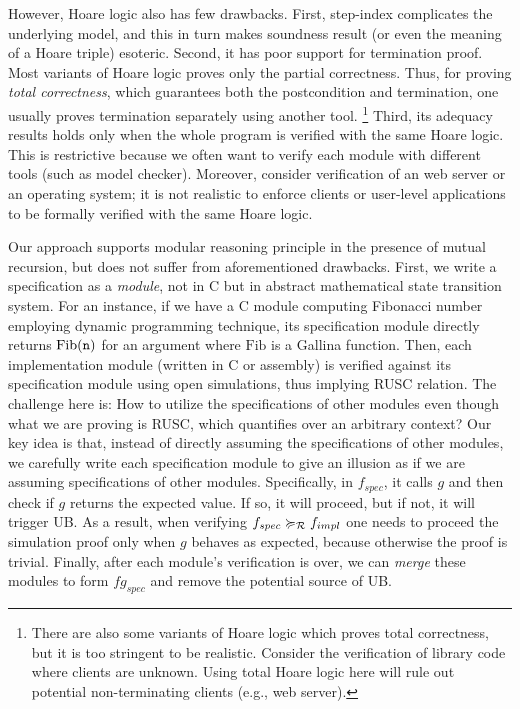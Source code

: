 However, Hoare logic also has few drawbacks.
First, step-index complicates the underlying model, and this in turn makes soundness result (or even the meaning of a Hoare triple) esoteric.
Second, it has poor support for termination proof.
Most variants of Hoare logic proves only the partial correctness.
Thus, for proving {\it total correctness}, which guarantees both the postcondition and termination, one usually proves termination separately using another tool.
\footnote{There are also some variants of Hoare logic which proves total correctness, but it is too stringent to be realistic. Consider the verification of library code where clients are unknown.
Using total Hoare logic here will rule out potential non-terminating clients (e.g., web server).}
Third, its adequacy results holds only when the whole program is verified with the same Hoare logic. This is restrictive because we often want to verify each module with different tools (such as model checker).
Moreover, consider verification of an web server or an operating system; it is not realistic to enforce clients or user-level applications to be formally verified with the same Hoare logic.



Our approach supports modular reasoning principle in the presence of mutual recursion, but does not suffer from aforementioned drawbacks.
First, we write a specification as a {\it module}, not in C but in abstract mathematical state transition system. %
For an instance, if we have a C module computing Fibonacci number employing dynamic programming technique, its specification module directly returns $\mathrm{Fib}(\texttt{n})$ for an argument  where $\mathrm{Fib}$ is a Gallina function.
Then, each implementation module (written in C or assembly) is verified against its specification module using open simulations, thus implying RUSC relation.
The challenge here is: How to utilize the specifications of other modules even though what we are proving is RUSC, which quantifies over an arbitrary context?
Our key idea is that, instead of directly assuming the specifications of other modules, we carefully write each specification module to give an illusion as if we are assuming specifications of other modules.
Specifically, in $f_{spec}$, it calls $g$ and then check if $g$ returns the expected value. If so, it will proceed, but if not, it will trigger UB.
As a result, when verifying $f_{spec} \succcurlyeq_{\mathcal{R}} f_{impl}$ one needs to proceed the simulation proof only when $g$ behaves as expected, because otherwise the proof is trivial.
Finally, after each module's verification is over, we can {\it merge} these modules to form $fg_{spec}$ and remove the potential source of UB.

